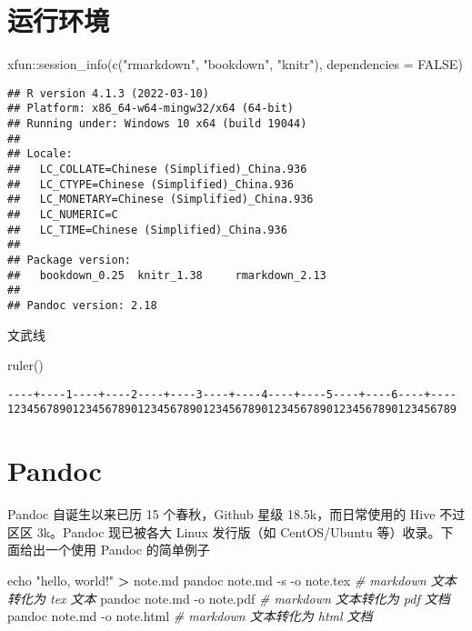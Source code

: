 \documentclass[
  lang=cn,
  11pt,
  scheme=chinese,
  chinesefont=nofont,
  citestyle=gb7714-2015,
  bibstyle=gb7714-2015]{elegantbook}
\newenvironment{Shaded}{\begin{snugshade}}{\end{snugshade}}
\newcommand{\AttributeTok}[1]{\textcolor[rgb]{0.77,0.63,0.00}{#1}}
\newcommand{\BuiltInTok}[1]{#1}
\newcommand{\CommentTok}[1]{\textcolor[rgb]{0.56,0.35,0.01}{\textit{#1}}}
\newcommand{\ConstantTok}[1]{\textcolor[rgb]{0.00,0.00,0.00}{#1}}
\newcommand{\ExtensionTok}[1]{#1}
\newcommand{\FunctionTok}[1]{\textcolor[rgb]{0.00,0.00,0.00}{#1}}
\newcommand{\NormalTok}[1]{#1}
\newcommand{\OperatorTok}[1]{\textcolor[rgb]{0.81,0.36,0.00}{\textbf{#1}}}
\newcommand{\SpecialCharTok}[1]{\textcolor[rgb]{0.00,0.00,0.00}{#1}}
\newcommand{\StringTok}[1]{\textcolor[rgb]{0.31,0.60,0.02}{#1}}
\begin{document}
\hypertarget{session-info}{%
\section{运行环境}\label{session-info}}

\begin{Shaded}
\begin{Highlighting}[]
\NormalTok{xfun}\SpecialCharTok{::}\FunctionTok{session\_info}\NormalTok{(}\FunctionTok{c}\NormalTok{(}\StringTok{"rmarkdown"}\NormalTok{, }\StringTok{"bookdown"}\NormalTok{, }\StringTok{"knitr"}\NormalTok{), }\AttributeTok{dependencies =} \ConstantTok{FALSE}\NormalTok{)}
\end{Highlighting}
\end{Shaded}

\begin{verbatim}
## R version 4.1.3 (2022-03-10)
## Platform: x86_64-w64-mingw32/x64 (64-bit)
## Running under: Windows 10 x64 (build 19044)
## 
## Locale:
##   LC_COLLATE=Chinese (Simplified)_China.936 
##   LC_CTYPE=Chinese (Simplified)_China.936   
##   LC_MONETARY=Chinese (Simplified)_China.936
##   LC_NUMERIC=C                              
##   LC_TIME=Chinese (Simplified)_China.936    
## 
## Package version:
##   bookdown_0.25  knitr_1.38     rmarkdown_2.13
## 
## Pandoc version: 2.18
\end{verbatim}

文武线

\begin{Shaded}
\begin{Highlighting}[]
\FunctionTok{ruler}\NormalTok{()}
\end{Highlighting}
\end{Shaded}

\begin{verbatim}
----+----1----+----2----+----3----+----4----+----5----+----6----+----
123456789012345678901234567890123456789012345678901234567890123456789
\end{verbatim}

\hypertarget{pandoc}{%
\section{Pandoc}\label{pandoc}}

Pandoc 自诞生以来已历 15 个春秋，Github 星级 18.5k，而日常使用的 Hive 不过区区 3k。Pandoc 现已被各大 Linux 发行版（如 CentOS/Ubuntu 等）收录。下面给出一个使用 Pandoc 的简单例子

\begin{Shaded}
\begin{Highlighting}[]
\BuiltInTok{echo} \StringTok{"hello, world!"} \OperatorTok{\textgreater{}}\NormalTok{ note.md}
\ExtensionTok{pandoc}\NormalTok{ note.md }\AttributeTok{{-}s} \AttributeTok{{-}o}\NormalTok{ note.tex }\CommentTok{\# markdown 文本转化为 tex 文本}
\ExtensionTok{pandoc}\NormalTok{ note.md }\AttributeTok{{-}o}\NormalTok{ note.pdf    }\CommentTok{\# markdown 文本转化为 pdf 文档}
\ExtensionTok{pandoc}\NormalTok{ note.md }\AttributeTok{{-}o}\NormalTok{ note.html   }\CommentTok{\# markdown 文本转化为 html 文档}
\end{Highlighting}
\end{Shaded}
\end{document}
